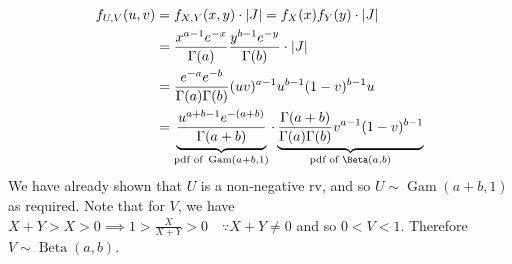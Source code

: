 \documentclass[notoc,notitlepage]{tufte-book}
\DeclareMathOperator{\Gam}{Gam }
\DeclareMathOperator{\BetaDist}{Beta }
\begin{document}
\begin{solution}
  \begin{align*}
    f_{U, V}(u, v) &= f_{X, Y}(x, y) \cdot \abs{J} = f_X(x) f_Y(y) \cdot \abs{J} \\
                   &= \frac{x^{a - 1} e^{-x}}{\Gamma(a)} \frac{y^{b - 1} e^{-y}}{\Gamma(b)} \cdot \abs{J} \\
                   &= \frac{e^{-a} e^{-b}}{\Gamma(a) \Gamma(b)} (uv)^{a - 1} u^{b - 1} ( 1 - v )^{b - 1} u \\
                   &= \underbrace{ \frac{u^{a + b - 1} e^{-(a + b)}}{\Gamma(a + b)} }_{\text{pdf of } \Gam(a + b, 1)} \cdot \underbrace{ \frac{\Gamma(a + b)}{\Gamma(a) \Gamma(b)} v^{a - 1} (1 - v)^{b - 1} }_{\text{pdf of } \Beta(a, b)}
  \end{align*}
  We have already shown that $U$ is a non-negative rv, and so $U \sim \Gam(a + b, 1)$ as required. Note that for $V$, we have
  $X + Y > X > 0 \implies 1 > \frac{X}{X + Y} > 0 \quad \because X + Y \neq 0$ and so $0 < V < 1$. Therefore $V \sim \BetaDist(a, b)$.
\end{solution}




\nobibliography*


\printindex
\end{document}
